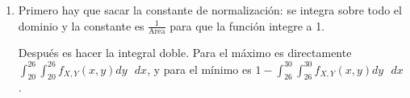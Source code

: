 \begin{enumerate}
	\item
		Primero hay que sacar la constante de normalización: se integra sobre todo el dominio y la constante es $\frac{1}{\text{Area}}$ para que la función integre a 1.
		
		Después es hacer la integral doble. Para el máximo es directamente $\int_{20}^{26}\int_{20}^{26} f_{X,Y}(x,y) dy\text{ }dx$,
		y para el mínimo es $1 - \int_{26}^{30}\int_{26}^{30} f_{X,Y}(x,y) dy\text{ }dx$.
\end{enumerate}

